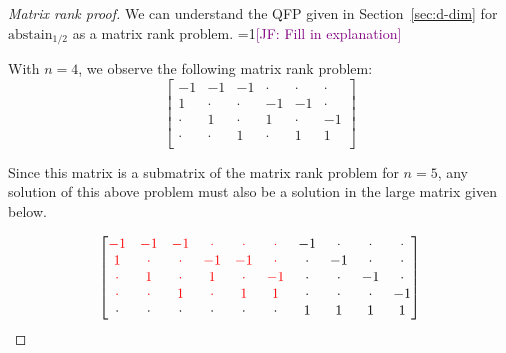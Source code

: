 \documentclass[anon]{colt2020} %
\newcommand{\Comments}{1}
\newcommand{\mynote}[2]{\ifnum\Comments=1\textcolor{#1}{#2}\fi}
\newcommand{\jessie}[1]{\mynote{purple}{[JF: #1]}}
\newcommand{\abstain}[1]{\mathrm{abstain}_{#1}}
\begin{document}
\begin{proof}[Matrix rank proof]
  We can understand the QFP given in Section~\ref{sec:d-dim} for $\abstain{1/2}$ as a matrix rank problem.
  \jessie{Fill in explanation}
  
  With $n=4$, we observe the following matrix rank problem:
  \[
  \begin{bmatrix}
  	-1 & -1 & -1 & \cdot & \cdot & \cdot \\
  	1 & \cdot & \cdot & -1 & -1 & \cdot \\
  	\cdot & 1 & \cdot & 1 & \cdot & -1 \\
  	\cdot & \cdot & 1 & \cdot & 1 & 1 \\
  \end{bmatrix}
  \]
  
  Since this matrix is a submatrix of the matrix rank problem for $n=5$, any solution of this above problem must also be a solution in the large matrix given below.
  
  \[
  \begin{bmatrix}
  {\color{red} -1} & {\color{red} -1} & {\color{red} -1} & {\color{red} \cdot} & {\color{red} \cdot} & {\color{red} \cdot} & -1 & \cdot & \cdot & \cdot \\
  {\color{red} 1} & {\color{red} \cdot} & {\color{red} \cdot} & {\color{red} -1} & {\color{red} -1} & {\color{red} \cdot} & \cdot & -1 & \cdot & \cdot \\
  {\color{red} \cdot} & {\color{red} 1} & {\color{red} \cdot} & {\color{red} 1} & {\color{red} \cdot} & {\color{red} -1} & \cdot & \cdot & -1 & \cdot \\
  {\color{red} \cdot} & {\color{red} \cdot} & {\color{red} 1} & {\color{red} \cdot} & {\color{red} 1} & {\color{red} 1} & \cdot & \cdot & \cdot & -1 \\
  \cdot & \cdot & \cdot & \cdot & \cdot & \cdot & 1 & 1 & 1 & 1\\
  \end{bmatrix}
  \]
  

\end{proof}
\end{document}
